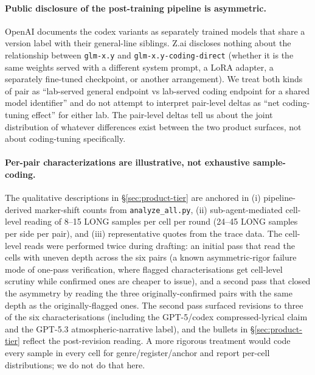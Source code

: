 \documentclass[11pt,a4paper]{article}
\begin{document}
\begin{sloppypar}
\paragraph{Public disclosure of the post-training pipeline is asymmetric.} OpenAI documents the codex variants as separately trained models that share a version label with their general-line siblings. Z.ai discloses nothing about the relationship between \texttt{glm-x.y} and \texttt{glm-x.y-coding-direct} (whether it is the same weights served with a different system prompt, a LoRA adapter, a separately fine-tuned checkpoint, or another arrangement). We treat both kinds of pair as ``lab-served general endpoint vs lab-served coding endpoint for a shared model identifier'' and do not attempt to interpret pair-level deltas as ``net coding-tuning effect'' for either lab. The pair-level deltas tell us about the joint distribution of whatever differences exist between the two product surfaces, not about coding-tuning specifically.
\end{sloppypar}

\begin{sloppypar}
\paragraph{Per-pair characterizations are illustrative, not exhaustive sample-coding.} The qualitative descriptions in \S\ref{sec:product-tier} are anchored in (i) pipeline-derived marker-shift counts from \texttt{analyze\_all.py}, (ii) sub-agent-mediated cell-level reading of 8--15 LONG samples per cell per round (24--45 LONG samples per side per pair), and (iii) representative quotes from the trace data. The cell-level reads were performed twice during drafting: an initial pass that read the cells with uneven depth across the six pairs (a known asymmetric-rigor failure mode of one-pass verification, where flagged characterisations get cell-level scrutiny while confirmed ones are cheaper to issue), and a second pass that closed the asymmetry by reading the three originally-confirmed pairs with the same depth as the originally-flagged ones. The second pass surfaced revisions to three of the six characterisations (including the GPT-5/codex compressed-lyrical claim and the GPT-5.3 atmospheric-narrative label), and the bullets in \S\ref{sec:product-tier} reflect the post-revision reading. A more rigorous treatment would code every sample in every cell for genre/register/anchor and report per-cell distributions; we do not do that here.
\end{sloppypar}
\end{document}
